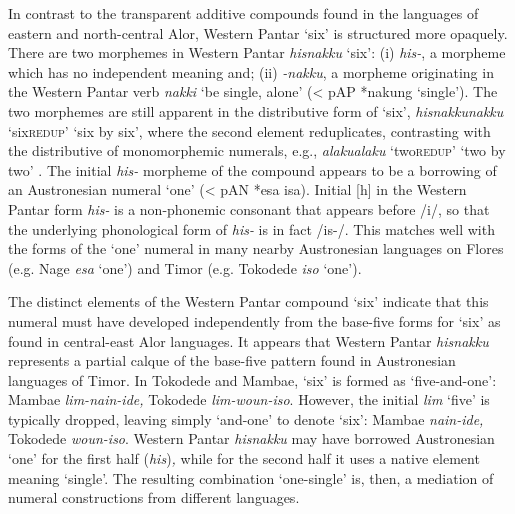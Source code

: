 In contrast to the transparent additive compounds found in the languages of eastern and north-central Alor, Western Pantar `six' is structured more opaquely. There are two morphemes in Western Pantar \textit{hisnakku}\textit{{\ng}} `six': (i) \textit{his-}, a morpheme which has no independent meaning and; (ii) \textit{{}-nakku}\textit{{\ng}}, a morpheme originating in the Western Pantar verb \textit{nakki}\textit{{\ng}} `be single, alone' ({\textless} pAP *nakung `single'). The two morphemes are still apparent in the distributive form of `six', \textit{hisnakku}\textit{{\ng}}\textit{{\Tilde}nakku}\textit{{\ng}} `six{\Tilde}\textsc{redup}' `six by six', where the second element reduplicates, contrasting with the distributive of monomorphemic numerals, e.g., \textit{alaku{\Tilde}alaku} `two{\Tilde}\textsc{redup}' `two by two' \citep{KlamerSchapperCorbettTVnumeralwords}. The initial \textit{his-} morpheme of the compound appears to be a borrowing of an Austronesian numeral `one' ({\textless} pAN *esa {\Tilde} isa). Initial [h] in the Western Pantar form \textit{his-} is a non-phonemic consonant that appears before /i/, so that the underlying phonological form of \textit{his-} is in fact /is-/. This matches well with the forms of the `one' numeral in many nearby Austronesian languages on Flores (e.g. Nage \textit{esa} `one') and Timor (e.g. Tokodede \textit{iso} `one'). 

The distinct elements of the Western Pantar compound `six' indicate that this numeral must have developed independently from the base-five forms for `six' as found in central-east Alor languages. It appears that Western Pantar \textit{hisnakku}\textit{{\ng}} represents a partial calque of the base-five pattern found in Austronesian languages of Timor. In Tokodede and Mambae, `six' is formed as `five-and-one': Mambae \textit{lim-nain-ide,} Tokodede \textit{lim-woun-iso}. However, the initial \textit{lim} `five' is typically dropped, leaving simply `and-one' to denote `six': Mambae \textit{nain-ide,} Tokodede \textit{woun-iso}. Western Pantar \textit{hisnakku}\textit{{\ng}} may have borrowed Austronesian `one' for the first half (\textit{his})\textit{,} while for the second half it uses a native element meaning `single'. The resulting combination `one-single' is, then, a mediation of numeral constructions from different languages.


